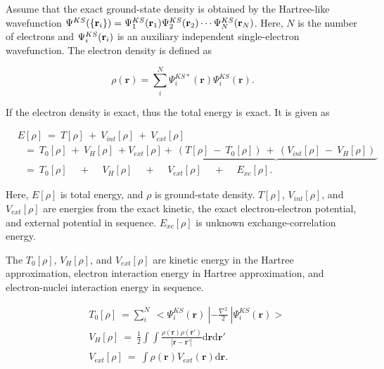 \documentclass[a4paper, 12pt, titlepage,oneside,drop]{kthesis}
\begin{document}
Assume that the exact ground-state density is obtained by the Hartree-like wavefunction $\wfks = \bwf<1><1> \bwf<2><2> \cdots \bwf<N><N>$. Here, $N$ is the number of electrons and $\bwf<i><i>$ is an auxiliary independent
single-electron wavefunction. The electron density is defined as

\begin{equation}\label{ks1}
 \rho(\textbf{r}) = \sum\limits_i^{N} {\Psi^{{KS}*}_{i}(\textbf{r})} {\Psi^{{KS}}_{i}(\textbf{r})}.
\end{equation}

If the electron density is exact, thus the total energy is exact. It is given as

\begin{equation}\label{kse}
\begin{split}
&E[\rho] \ =\ T[\rho] \ + \ V_{int}[\rho] \ + \ V_{ext}[\rho]  \\
&\ \ \   = \ T_{0}[\rho] \ + \ V_{H}[\rho] \ + V_{ext}[\rho]+\underbrace{\ (T[\rho] \ - \ T_{0}[\rho]) \ + \  (V_{int}[\rho] \ - \ V_{H}[\rho])\ }       \\
&\ \ \   = \ T_{0}[\rho] \quad \,  + \quad \,  V_{H}[\rho] \quad \, + \quad \, V_{ext}[\rho] \quad \, + \quad \, E_{xc}[\rho].
\end{split}
\end{equation}

Here, $E[\rho]$  is total energy, and $\rho$ is ground-state density. $T[\rho]$, $V_{int}[\rho]$, and $V_{ext}[\rho]$ are energies from the exact kinetic, 
the exact electron-electron potential, and external potential in sequence. $E_{xc}[\rho]$ is unknown exchange-correlation energy.

The $T_{0}[\rho]$, $V_{H}[\rho]$, and $V_{ext}[\rho]$ are kinetic energy in the Hartree approximation, electron interaction energy in Hartree approximation, and electron-nuclei interaction energy in sequence.

\begin{equation}\begin{split}\label{kankan}
& T_{0}[\rho]\ = \sum\limits_i^{N} \ < \Psi_{i}^{{KS}}(\textbf{r}) \ | -\frac{\nabla^{2}}{2} \ | \Psi_{i}^{{KS}}(\textbf{r}) > \\
& V_{H}[\rho] \ = \ \frac{1}{2} \int \int  \frac{\rho({\textbf{r}})\rho(\textbf{r}')}{|{\textbf{r}}-{\textbf{r}}'|} \mathrm{d} {\textbf{r}} \mathrm{d}{\textbf{r}'}\\
& V_{ext}[\rho]\ = \ \int  \rho(\textbf{r}) V_{ext}(\textbf{r})\mathrm{d}{\textbf{r}}. 
\end{split}
\end{equation}
\end{document}
